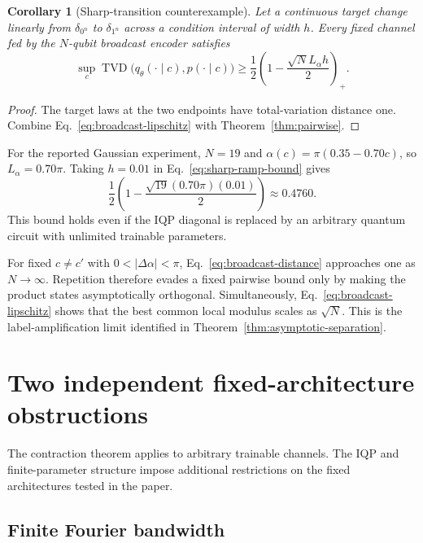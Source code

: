 \documentclass[11pt]{article}
\newtheorem{corollary}[theorem]{Corollary}
\theoremstyle{definition}
\theoremstyle{remark}
\newcommand{\TVD}{\operatorname{TVD}}
\begin{document}
\begin{corollary}[Sharp-transition counterexample]
\label{cor:sharp-ramp}
Let a continuous target change linearly from $\delta_{0^n}$ to
$\delta_{1^n}$ across a condition interval of width $h$.  Every fixed channel
fed by the $N$-qubit broadcast encoder satisfies
\begin{equation}
 \sup_c\TVD\bigl(q_\theta(\cdot\mid c),p(\cdot\mid c)\bigr)
 \geq\frac12\left(1-\frac{\sqrt{N}L_\alpha h}{2}\right)_+.
 \label{eq:sharp-ramp-bound}
\end{equation}
\end{corollary}

\begin{proof}
The target laws at the two endpoints have total-variation distance one.
Combine Eq.~\eqref{eq:broadcast-lipschitz} with
Theorem~\ref{thm:pairwise}.
\end{proof}

For the reported Gaussian experiment,
$N=19$ and $\alpha(c)=\pi(0.35-0.70c)$, so
$L_\alpha=0.70\pi$.  Taking $h=0.01$ in
Eq.~\eqref{eq:sharp-ramp-bound} gives
\begin{equation}
 \frac12\left(1-\frac{\sqrt{19}(0.70\pi)(0.01)}{2}\right)
 \approx 0.4760.
 \label{eq:paper-numerical-bound}
\end{equation}
This bound holds even if the IQP diagonal is replaced by an arbitrary quantum
circuit with unlimited trainable parameters.

For fixed $c\neq c'$ with
$0<|\Delta\alpha|<\pi$, Eq.~\eqref{eq:broadcast-distance} approaches one as
$N\to\infty$.  Repetition therefore evades a fixed pairwise bound only by
making the product states asymptotically orthogonal.  Simultaneously,
Eq.~\eqref{eq:broadcast-lipschitz} shows that the best common local modulus
scales as $\sqrt{N}$.  This is the label-amplification limit identified in
Theorem~\ref{thm:asymptotic-separation}.

\section{Two independent fixed-architecture obstructions}
\label{sec:fixed}

The contraction theorem applies to arbitrary trainable channels.  The IQP
and finite-parameter structure impose additional restrictions on the fixed
architectures tested in the paper.

\subsection{Finite Fourier bandwidth}
\end{document}
